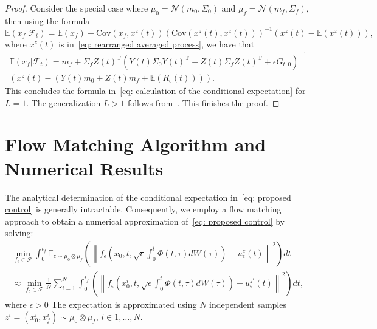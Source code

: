 \documentclass[12pt]{amsart}
\renewcommand{\(}{\left (}
\renewcommand{\)}{\right )}
\numberwithin{equation}{section}
\begin{document}
\begin{proof}
Consider the special case where $\mu_0=\mathcal{N}(m_0,\Sigma_0)$ and $\mu_f=\mathcal{N}(m_f,\Sigma_f)$, then using the formula
\begin{equation*}
\mathbb{E}(x_f|\mathcal{F}_t)=\mathbb{E}(x_f)+\mathrm{Cov}(x_f,x^z(t))(\mathrm{Cov}(x^z(t),x^z(t)))^{-1}(x^z(t)-\mathbb{E}(x^z(t))),  
\end{equation*}
where $x^z(t)$ is in~\eqref{eq: rearranged averaged process}, we have that
\begin{align*}
\mathbb{E}(x_f|\mathcal{F}_t)= m_f+\Sigma_fZ(t)^{\mathrm{T}}\left(Y(t)\Sigma_0 Y(t)^{\mathrm{T}}+Z(t)\Sigma_f Z(t)^{\mathrm{T}}+\epsilon G_{t,0}\right)^{-1}\\ \left(x^z(t)-\left(Y(t)m_0+Z(t)m_f+\mathbb{E}(R_{\epsilon}(t))\right)\right).
\end{align*}
This concludes the formula in~\eqref{eq: calculation of the conditional expectation} for $L=1$. The generalization $L>1$ follows from~\cite{YM-MA-AT-YC:24}. This finishes the proof.
\end{proof}

\section{Flow Matching Algorithm and Numerical Results}\label{sec: Flow Matching Algorithm and Numerical Results}
The analytical determination of the conditional expectation in~\eqref{eq: proposed control} is generally intractable.  Consequently, we employ a flow matching approach to obtain a numerical approximation of~\eqref{eq: proposed control} by solving: %
\begin{multline}\label{eq: loss function of flow matching}
\min_{f_{\epsilon}\in \mathcal{F}}\int_0^{t_f}\mathbb{E}_{z\sim\mu_0\otimes\mu_f}\left(\left\|f_{\epsilon}\left(x_0,t,\sqrt{\epsilon}\int_{0}^{t}\Phi(t,\tau) d W(\tau)\right)-u_{\epsilon}^z(t)\right\|^2\right)dt\\\approx \min_{f_{\epsilon}\in \mathcal{F}}\frac{1}{N}\sum^N_{i=1}\int_0^{t_f}\left(\left\|f_{\epsilon}\left(x^i_0,t,\sqrt{\epsilon}\int_{0}^{t}\Phi(t,\tau) d W(\tau)\right)-u_{\epsilon}^{z^i}(t)\right\|^2\right)dt,
\end{multline}
where $\epsilon> 0$ 
The expectation is approximated using $N$ independent samples $z^i = (x^i_0, x^i_f) \sim \mu_0 \otimes \mu_f$, $i \in {1, \dots, N}$. %
\end{document}
